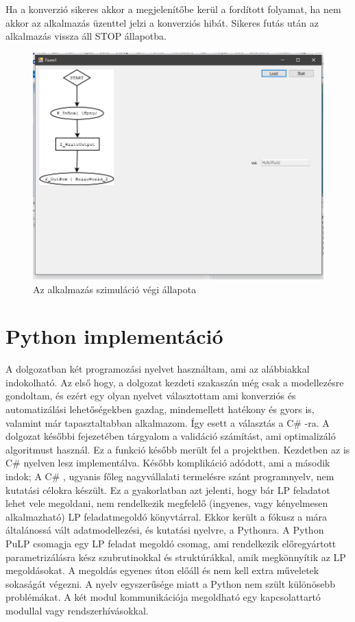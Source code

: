 Ha a konverzió sikeres akkor a megjelenítőbe kerül a fordított folyamat, ha nem akkor az alkalmazás üzenttel jelzi a konverziós hibát. Sikeres futás után az alkalmazás vissza áll STOP állapotba.
\begin{figure}[h!]
\centering
\includegraphics[scale=0.4]{images/done.png}
\caption{Az alkalmazás szimuláció végi állapota}
\end{figure}
\newpage
\section{Python implementáció}
A dolgozatban két programozási nyelvet használtam, ami az alábbiakkal indokolható. Az első hogy, a dolgozat kezdeti szakaszán még csak a modellezésre gondoltam, és ezért egy olyan nyelvet választottam ami konverziós és automatizálási lehetőségekben gazdag, mindemellett hatékony és gyors is, valamint már tapasztaltabban alkalmazom. Így esett a választás a C\# -ra. A dolgozat későbbi fejezetében tárgyalom a validáció számítást, ami optimalizáló algoritmust használ. Ez a funkció később merült fel a projektben. Kezdetben az is C\# nyelven lesz implementálva. Később komplikáció adódott, ami a második indok; A C\# , ugyanis főleg nagyvállalati termelésre szánt programnyelv, nem kutatási célokra készült. Ez a gyakorlatban azt jelenti, hogy bár LP feladatot lehet vele megoldani, nem rendelkezik megfelelő (ingyenes, vagy kényelmesen alkalmazható) LP feladatmegoldó könyvtárral. Ekkor került a fókusz a mára általánossá vált adatmodellezési, és kutatási nyelvre, a Pythonra. A Python PuLP csomagja egy LP feladat megoldó csomag, ami rendelkezik előregyártott parametrizálásra kész szubrutinokkal és struktúrákkal, amik megkönnyítik az LP megoldásokat. A megoldás egyenes úton előáll és nem kell extra műveletek sokaságát végezni. A nyelv egyszerűsége miatt a Python nem szült különösebb problémákat. A két modul kommunikációja megoldható egy kapcsolattartó modullal vagy rendszerhívásokkal.

